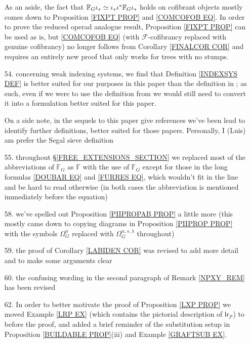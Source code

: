 \documentclass{article}
\begin{document}
\begin{itemize}
	As an aside, the fact that 	
	$\mathbb{F}_G \iota_{\**} \simeq 
	\iota_{\**} \iota^{\**} \mathbb{F}_G \iota_{\**}$
	holds on cofibrant objects mostly comes down to
	Proposition \ref{FIXPT PROP} 
	and \eqref{COMCOFOB EQ}.
%	
	In order to prove the reduced operad analogue result, 
	Proposition \ref{FIXPT PROP} can be used as is, 
	but \eqref{COMCOFOB EQ} 
	(with $\mathcal{F}$-cofibrancy replaced with genuine cofibrancy)
	no longer follows from Corollary \ref{FINALCOR COR}
	and requires an entirely new proof that only works
	for trees with no stumps.
	
	\item[54.] concerning weak indexing systems,
	we find that Definition \ref{INDEXSYS DEF}
	is better suited for our purposes in this paper than 
	the definition in \cite{Pe17}; as such, even if we were to use the definition from \cite{Pe17} we would still need to convert it into a formulation better suited for this paper.
	
	On a side note, in the sequels to this paper 
	{\color{red} give references}
	we've been lead to identify further definitions,
	better suited for those papers.
	Personally, I (Luis) am prefer the Segal sieve definition
	
	
	\item[55.] throughout \S \ref{FREE_EXTENSIONS_SECTION}
	we replaced most of the abbreviations of
	$\mathbb{F}_G$ as $\mathbb{F}$ with the use of $\mathbb{F}_G$
	except for those in the long formulas
	\eqref{DOUBAR EQ} and \eqref{FURRES EQ},
	which wouldn't fit in the line and be hard to read otherwise
	(in both cases the abbreviation is mentioned immediately before the equation)

	\item[58.]
	we've spelled out Proposition \ref{PIIPROPAB PROP}
	a little more (this mostly came down to copying
	diagrams in Proposition \ref{PIIPROP PROP}
	with the symbols 
	$\Omega^n_G$
	replaced with 
	$\Omega^{n,s,\lambda}_{G}$ throughout)
	
	\item[59.] the proof of Corollary \ref{LABIDEN COR}
	was revised to add more detail and to make
	some arguments clear

	\item[60.]
	the confusing wording in the second paragraph of 
	Remark \ref{NPXY_REM} has been revised

	\item[62.] 
	In order to better motivate the proof of 
	Proposition \ref{LXP PROP}
	we moved Example \ref{LRP EX}
	(which contains the pictorial description of $\mathsf{lr}_{\mathcal{P}}$) to before the proof,
	and added a brief reminder of the substitution setup in 
	Proposition \ref{BUILDABLE PROP}(iii)
	and Example \ref{GRAFTSUB EX}.


\end{itemize}
\end{document}
